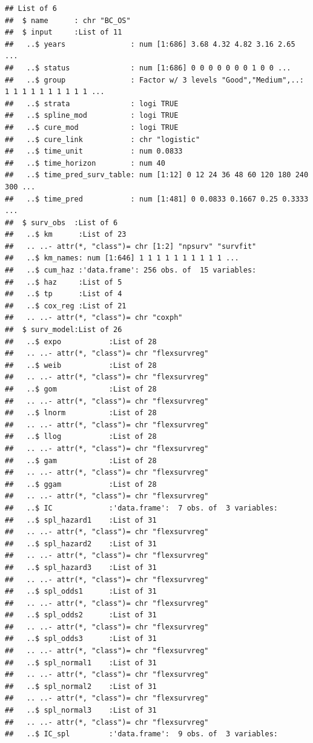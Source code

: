 \documentclass[]{article}
\begin{document}
\begin{verbatim}
## List of 6
##  $ name      : chr "BC_OS"
##  $ input     :List of 11
##   ..$ years               : num [1:686] 3.68 4.32 4.82 3.16 2.65 ...
##   ..$ status              : num [1:686] 0 0 0 0 0 0 0 1 0 0 ...
##   ..$ group               : Factor w/ 3 levels "Good","Medium",..: 1 1 1 1 1 1 1 1 1 1 ...
##   ..$ strata              : logi TRUE
##   ..$ spline_mod          : logi TRUE
##   ..$ cure_mod            : logi TRUE
##   ..$ cure_link           : chr "logistic"
##   ..$ time_unit           : num 0.0833
##   ..$ time_horizon        : num 40
##   ..$ time_pred_surv_table: num [1:12] 0 12 24 36 48 60 120 180 240 300 ...
##   ..$ time_pred           : num [1:481] 0 0.0833 0.1667 0.25 0.3333 ...
##  $ surv_obs  :List of 6
##   ..$ km      :List of 23
##   .. ..- attr(*, "class")= chr [1:2] "npsurv" "survfit"
##   ..$ km_names: num [1:646] 1 1 1 1 1 1 1 1 1 1 ...
##   ..$ cum_haz :'data.frame': 256 obs. of  15 variables:
##   ..$ haz     :List of 5
##   ..$ tp      :List of 4
##   ..$ cox_reg :List of 21
##   .. ..- attr(*, "class")= chr "coxph"
##  $ surv_model:List of 26
##   ..$ expo           :List of 28
##   .. ..- attr(*, "class")= chr "flexsurvreg"
##   ..$ weib           :List of 28
##   .. ..- attr(*, "class")= chr "flexsurvreg"
##   ..$ gom            :List of 28
##   .. ..- attr(*, "class")= chr "flexsurvreg"
##   ..$ lnorm          :List of 28
##   .. ..- attr(*, "class")= chr "flexsurvreg"
##   ..$ llog           :List of 28
##   .. ..- attr(*, "class")= chr "flexsurvreg"
##   ..$ gam            :List of 28
##   .. ..- attr(*, "class")= chr "flexsurvreg"
##   ..$ ggam           :List of 28
##   .. ..- attr(*, "class")= chr "flexsurvreg"
##   ..$ IC             :'data.frame':  7 obs. of  3 variables:
##   ..$ spl_hazard1    :List of 31
##   .. ..- attr(*, "class")= chr "flexsurvreg"
##   ..$ spl_hazard2    :List of 31
##   .. ..- attr(*, "class")= chr "flexsurvreg"
##   ..$ spl_hazard3    :List of 31
##   .. ..- attr(*, "class")= chr "flexsurvreg"
##   ..$ spl_odds1      :List of 31
##   .. ..- attr(*, "class")= chr "flexsurvreg"
##   ..$ spl_odds2      :List of 31
##   .. ..- attr(*, "class")= chr "flexsurvreg"
##   ..$ spl_odds3      :List of 31
##   .. ..- attr(*, "class")= chr "flexsurvreg"
##   ..$ spl_normal1    :List of 31
##   .. ..- attr(*, "class")= chr "flexsurvreg"
##   ..$ spl_normal2    :List of 31
##   .. ..- attr(*, "class")= chr "flexsurvreg"
##   ..$ spl_normal3    :List of 31
##   .. ..- attr(*, "class")= chr "flexsurvreg"
##   ..$ IC_spl         :'data.frame':  9 obs. of  3 variables:

\end{verbatim}
\end{document}
